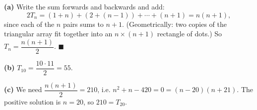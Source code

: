 \textbf{(a)} Write the sum forwards and backwards and add:
\[2T_n=(1+n)+(2+(n-1))+\cdots+(n+1)=n(n+1),\]
since each of the $n$ pairs sums to $n+1$. (Geometrically: two copies of the triangular array fit together into an $n\times(n+1)$ rectangle of dots.) So $T_n=\dfrac{n(n+1)}{2}$. $\blacksquare$

\textbf{(b)} $T_{10}=\dfrac{10\cdot11}{2}=\boxed{55}$.

\textbf{(c)} We need $\dfrac{n(n+1)}{2}=210$, i.e. $n^2+n-420=0=(n-20)(n+21)$. The positive solution is $n=20$, so $210=\boxed{T_{20}}$.
